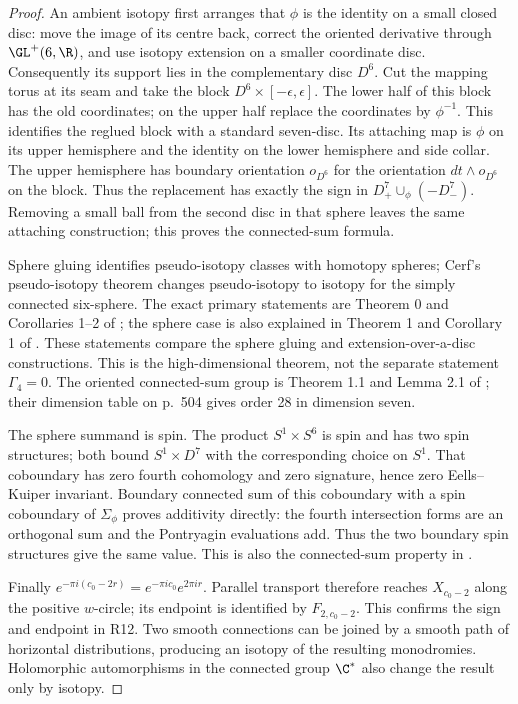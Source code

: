 \begin{proof}
An ambient isotopy first arranges that $\phi$ is the identity on a
small closed disc: move the image of its centre back, correct the
oriented derivative through $\GL^+(6,\R)$, and use isotopy extension
on a smaller coordinate disc. Consequently its support lies in the
complementary disc $D^6$. Cut the mapping torus at its seam and take
the block $D^6\times[-\epsilon,\epsilon]$. The lower half of this
block has the old coordinates; on the upper half replace the
coordinates by $\phi^{-1}$. This identifies the reglued block with a
standard seven-disc. Its attaching map is $\phi$ on its upper
hemisphere and the identity on the lower hemisphere and side collar.
The upper hemisphere has boundary orientation $o_{D^6}$ for the
orientation $dt\wedge o_{D^6}$ on the block. Thus the replacement
has exactly the sign in $D^7_+\cup_\phi(-D^7_-)$.
Removing a small ball from the second disc in that sphere leaves the
same attaching construction; this proves the connected-sum formula.

Sphere gluing identifies pseudo-isotopy classes with homotopy spheres;
Cerf's pseudo-isotopy theorem changes pseudo-isotopy to isotopy for
the simply connected six-sphere. The exact primary statements are
Theorem 0 and Corollaries 1--2 of \citet[p.~8]{Cerf1970};
the sphere case is also explained in Theorem 1 and Corollary 1 of
\citet[p.~156]{Poenaru1971}. These statements compare the
sphere gluing and extension-over-a-disc constructions. This is the
high-dimensional theorem, not the separate statement $\Gamma_4=0$.
The oriented connected-sum group is Theorem 1.1 and Lemma 2.1 of
\citet[pp.~504--505]{KervaireMilnor1963}; their dimension table on
p.~504 gives order 28 in dimension seven.

The sphere summand is spin. The product $S^1\times S^6$ is spin and
has two spin structures; both bound $S^1\times D^7$ with the
corresponding choice on $S^1$. That coboundary has zero fourth
cohomology and zero signature, hence zero Eells--Kuiper invariant.
Boundary connected sum of this coboundary with a spin coboundary of
$\Sigma_\phi$ proves additivity directly: the fourth intersection
forms are an orthogonal sum and the Pontryagin evaluations add.
Thus the two boundary spin structures give the same value. This is
also the connected-sum property in \citet[Section 3]{EellsKuiper1962}.

Finally $e^{-\pi i(c_0-2r)}=e^{-\pi ic_0}e^{2\pi ir}$.
Parallel transport therefore reaches $X_{c_0-2}$ along the positive
$w$-circle; its endpoint is identified by $F_{2,c_0-2}$.
This confirms the sign and endpoint in R12. Two smooth connections
can be joined by a smooth path of horizontal distributions, producing
an isotopy of the resulting monodromies. Holomorphic automorphisms in
the connected group $\C^*$ also change the result only by isotopy.
\end{proof}

